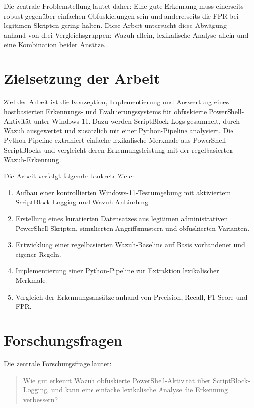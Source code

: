 \documentclass[12pt,a4paper,oneside,parskip=half]{scrreprt}
\begin{document}
Die zentrale Problemstellung lautet daher: Eine gute Erkennung muss einerseits robust gegenüber einfachen Obfuskierungen sein und andererseits die FPR bei legitimen Skripten gering halten. Diese Arbeit untersucht diese Abwägung anhand von drei Vergleichsgruppen: Wazuh allein, lexikalische Analyse allein und eine Kombination beider Ansätze.

\section{Zielsetzung der Arbeit}
Ziel der Arbeit ist die Konzeption, Implementierung und Auswertung eines hostbasierten Erkennungs- und Evaluierungssystems für obfuskierte PowerShell-Aktivität unter Windows 11. Dazu werden ScriptBlock-Logs gesammelt, durch Wazuh ausgewertet und zusätzlich mit einer Python-Pipeline analysiert. Die Python-Pipeline extrahiert einfache lexikalische Merkmale aus PowerShell-ScriptBlocks und vergleicht deren Erkennungsleistung mit der regelbasierten Wazuh-Erkennung.

Die Arbeit verfolgt folgende konkrete Ziele:
\begin{enumerate}[label=Z\arabic*]
    \item Aufbau einer kontrollierten Windows-11-Testumgebung mit aktiviertem ScriptBlock-Logging und Wazuh-Anbindung.
    \item Erstellung eines kuratierten Datensatzes aus legitimen administrativen PowerShell-Skripten, simulierten Angriffsmustern und obfuskierten Varianten.
    \item Entwicklung einer regelbasierten Wazuh-Baseline auf Basis vorhandener und eigener Regeln.
    \item Implementierung einer Python-Pipeline zur Extraktion lexikalischer Merkmale.
    \item Vergleich der Erkennungsansätze anhand von Precision, Recall, F1-Score und FPR.
\end{enumerate}

\section{Forschungsfragen}
Die zentrale Forschungsfrage lautet:

\begin{quote}
Wie gut erkennt Wazuh obfuskierte PowerShell-Aktivität über ScriptBlock-Logging, und kann eine einfache lexikalische Analyse die Erkennung verbessern?
\end{quote}
\end{document}
